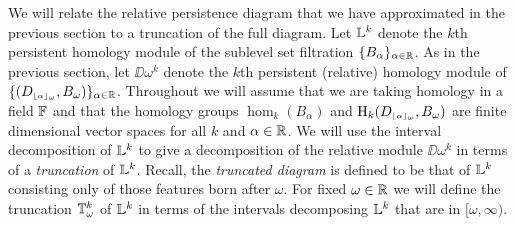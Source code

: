 

We will relate the relative persistence diagram that we have approximated in the previous section to a truncation of the full diagram.
Let $\mathbb{L}^k$ denote the $k$th persistent homology module of the sublevel set filtration $\{B_\alpha\}_{\alpha\in\mathbb{R}}$.
As in the previous section, let $\DD{\omega}^k$ denote the $k$th persistent (relative) homology module of $\{(D_{\scriptscriptstyle \lfloor\alpha\rfloor_{\omega}}, B_\omega)\}_{\alpha\in\mathbb{R}}$.
Throughout we will assume that we are taking homology in a field $\mathbb{F}$ and that the homology groups $\hom_k(B_\alpha)$ and $\mathrm{H}_k(D_{\scriptscriptstyle \lfloor\alpha\rfloor_{\omega}}, B_\omega)$ are finite dimensional vector spaces for all $k$ and $\alpha\in\mathbb{R}$.
We will use the interval decomposition of $\mathbb{L}^k$ to give a decomposition of the relative module $\DD{\omega}^k$ in terms of a \emph{truncation} of $\mathbb{L}^k$.
Recall, the \emph{truncated diagram} is defined to be that of $\mathbb{L}^k$ consisting only of those features born after $\omega$.
For fixed $\omega\in\mathbb{R}$ we will define the truncation $\mathbb{T}^k_\omega$ of $\mathbb{L}^k$ in terms of the intervals decomposing $\mathbb{L}^k$ that are in $[\omega, \infty)$.

%

